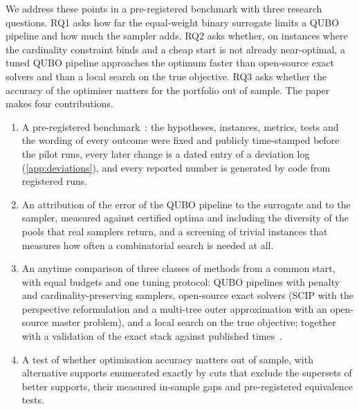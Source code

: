 We address these points in a pre-registered benchmark with three research questions. RQ1 asks how far the
equal-weight binary surrogate limits a QUBO pipeline and how much the sampler adds. RQ2 asks whether, on instances where
the cardinality constraint binds and a cheap start is not already near-optimal, a tuned QUBO pipeline approaches the
optimum faster than open-source exact solvers and than a local search on the true objective. RQ3 asks whether the
accuracy of the optimiser matters for the portfolio out of sample. The paper makes four contributions.
\begin{enumerate}
\item A pre-registered benchmark~\cite{nosek2018preregistration}: the hypotheses, instances, metrics, tests and the
wording of every outcome were fixed and publicly time-stamped before the pilot runs, every later change is a dated
entry of a deviation log (\ref{app:deviations}), and every reported number is generated by code from registered runs.
\item An attribution of the error of the QUBO pipeline to the surrogate and to the sampler, measured against certified
optima and including the diversity of the pools that real samplers return, and a screening of trivial instances that
measures how often a combinatorial search is needed at all.
\item An anytime comparison of three classes of methods from a common start, with equal budgets and one tuning
protocol: QUBO pipelines with penalty and cardinality-preserving samplers, open-source exact solvers (SCIP with the
perspective reformulation and a multi-tree outer approximation with an open-source master problem), and a local
search on the true objective; together with a validation of the exact stack against published
times~\cite{bertsimas2022scalable}.
\item A test of whether optimisation accuracy matters out of sample, with alternative supports enumerated exactly by
cuts that exclude the supersets of better supports, their measured in-sample gaps and pre-registered equivalence tests.
\end{enumerate}


